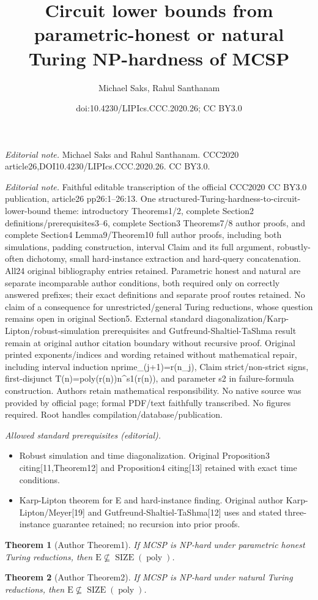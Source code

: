 \documentclass[10pt,a4paper]{article}
\title{Circuit lower bounds from parametric-honest or natural Turing NP-hardness of MCSP}
\author{Michael Saks, Rahul Santhanam}
\date{doi:10.4230/LIPIcs.CCC.2020.26; CC BY3.0}
\newtheorem{nttheorem}{Theorem}
\newcommand{\SIZE}{\operatorname{SIZE}}
\newcommand{\poly}{\operatorname{poly}}
\begin{document}
\maketitle
\noindent\textit{Editorial note.} Michael Saks and Rahul Santhanam. CCC2020 article26,DOI10.4230/LIPIcs.CCC.2020.26. CC BY3.0.\par\medskip
\noindent\textit{Editorial note.} Faithful editable transcription of the official CCC2020 CC BY3.0 publication, article26 pp26:1--26:13. One structured-Turing-hardness-to-circuit-lower-bound theme: introductory Theorems1/2, complete Section2 definitions/prerequisites3--6, complete Section3 Theorems7/8 author proofs, and complete Section4 Lemma9/Theorem10 full author proofs, including both simulations, padding construction, interval Claim and its full argument, robustly-often dichotomy, small hard-instance extraction and hard-query concatenation. All24 original bibliography entries retained. Parametric honest and natural are separate incomparable author conditions, both required only on correctly answered prefixes; their exact definitions and separate proof routes retained. No claim of a consequence for unrestricted/general Turing reductions, whose question remains open in original Section5. External standard diagonalization/Karp-Lipton/robust-simulation prerequisites and Gutfreund-Shaltiel-TaShma result remain at original author citation boundary without recursive proof. Original printed exponents/indices and wording retained without mathematical repair, including interval induction nprime\_(j+1)=r(n\_j), Claim strict/non-strict signs, first-disjunct T(n)=poly(r(n))n\textasciicircum{}s1(r(n)), and parameter s2 in failure-formula construction. Authors retain mathematical responsibility. No native source was provided by official page; formal PDF/text faithfully transcribed. No figures required. Root handles compilation/database/publication.\par\medskip
\noindent\textit{Allowed standard prerequisites (editorial).}\begin{itemize}
\item Robust simulation and time diagonalization. Original Proposition3 citing[11,Theorem12] and Proposition4 citing[13] retained with exact time conditions.
\item Karp-Lipton theorem for E and hard-instance finding. Original author Karp-Lipton/Meyer[19] and Gutfreund-Shaltiel-TaShma[12] uses and stated three-instance guarantee retained; no recursion into prior proofs.
\end{itemize}\medskip
\setcounter{nttheorem}{0}
\begin{nttheorem}[Author Theorem1]
If MCSP is NP-hard under parametric honest Turing reductions, then $\mathrm E\not\subseteq\SIZE(\poly)$.
\end{nttheorem}
\begin{nttheorem}[Author Theorem2]
If MCSP is NP-hard under natural Turing reductions, then $\mathrm E\not\subseteq\SIZE(\poly)$.
\end{nttheorem}
\end{document}
